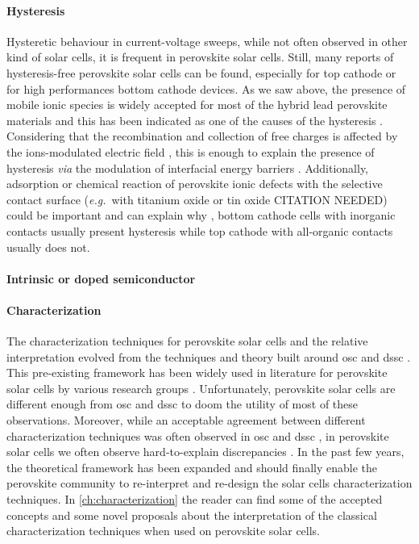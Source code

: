 	\paragraph{Hysteresis}
	Hysteretic behaviour in current-voltage sweeps, while not often observed in other kind of solar cells, it is frequent in perovskite solar cells.
	Still, many reports of hysteresis-free perovskite solar cells can be found, especially for top cathode or for high performances bottom cathode devices.
	As we saw above, the presence of mobile ionic species is widely accepted for most of the hybrid lead perovskite materials and this has been indicated as one of the causes of the hysteresis \cite{Unger2014,Xiao2015}.
	Considering that the recombination and collection of free charges is affected by the ions-modulated electric field \cite{Pockett2017}, this is enough to explain the presence of hysteresis \cite{Tress2015,Calado2016} \textsl{via} the modulation of interfacial energy barriers \cite{Moia2019}.
	Additionally, adsorption or chemical reaction of perovskite ionic defects with the selective contact surface (\textsl{e.g.}\ with titanium oxide \cite{Yu2016,Beilsten-Edmands2015,Carrillo2016} or tin oxide CITATION NEEDED) could be important and can explain why \cite{Moia2019}, bottom cathode cells with inorganic contacts usually present hysteresis while top cathode with all-organic contacts usually does not.

	\paragraph{Intrinsic or doped semiconductor}


	\paragraph{Characterization}
	The characterization techniques for perovskite solar cells and the relative interpretation evolved from the techniques and theory built around \gls{osc} and \gls{dssc} \cite{Barnes2013}.
	This pre-existing framework has been widely used in literature for perovskite solar cells by various research groups \cite{ORegan2015b,Shao2016,Gelmetti2019,Kiermasch2018,Carnie2015}.
	Unfortunately, perovskite solar cells are different enough from \gls{osc} and \gls{dssc} to doom the utility of most of these observations.
	Moreover, while an acceptable agreement between different characterization techniques was often observed in \gls{osc} \cite{Clarke2015,Maurano2011,Foertig2012} and \gls{dssc} \cite{Barnes2013}, in perovskite solar cells we often observe hard-to-explain discrepancies \cite{Kiermasch2018}.
	In the past few years, the theoretical framework has been expanded and should finally enable the perovskite community to re-interpret and re-design the solar cells characterization techniques.
	In \cref{ch:characterization} the reader can find some of the accepted concepts and some novel proposals about the interpretation of the classical characterization techniques when used on perovskite solar cells.

